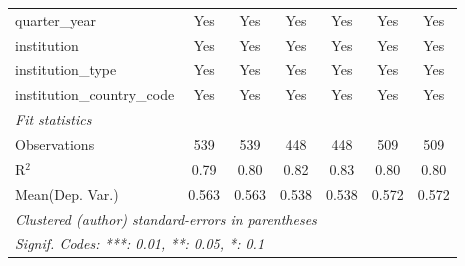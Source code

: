 \begin{tabular}{lcccccc}
   quarter\_year                      & Yes     & Yes     & Yes     & Yes         & Yes     & Yes\\  
   institution                        & Yes     & Yes     & Yes     & Yes         & Yes     & Yes\\  
   institution\_type                  & Yes     & Yes     & Yes     & Yes         & Yes     & Yes\\  
   institution\_country\_code         & Yes     & Yes     & Yes     & Yes         & Yes     & Yes\\  
   \midrule
   \emph{Fit statistics}\\
   Observations                       & 539     & 539     & 448     & 448         & 509     & 509\\  
   R$^2$                              & 0.79    & 0.80    & 0.82    & 0.83        & 0.80    & 0.80\\  
Mean(Dep. Var.) & 0.563 & 0.563 & 0.538 & 0.538 & 0.572 & 0.572 \\
   \midrule \midrule
   \multicolumn{7}{l}{\emph{Clustered (author) standard-errors in parentheses}}\\
   \multicolumn{7}{l}{\emph{Signif. Codes: ***: 0.01, **: 0.05, *: 0.1}}\\
\end{tabular}
\par\endgroup
